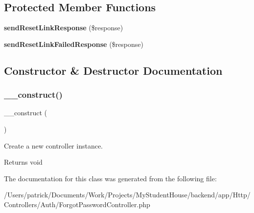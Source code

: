 \subsection*{Protected Member Functions}
\begin{DoxyCompactItemize}
\item 
\mbox{\label{class_app_1_1_http_1_1_controllers_1_1_auth_1_1_forgot_password_controller_a41f2cc3c868b9a160928d2febfa6e597}} 
{\bfseries send\+Reset\+Link\+Response} (\$response)
\item 
\mbox{\label{class_app_1_1_http_1_1_controllers_1_1_auth_1_1_forgot_password_controller_a8c3336a05518b8aca453a4af3836bc47}} 
{\bfseries send\+Reset\+Link\+Failed\+Response} (\$response)
\end{DoxyCompactItemize}


\subsection{Constructor \& Destructor Documentation}
\mbox{\label{class_app_1_1_http_1_1_controllers_1_1_auth_1_1_forgot_password_controller_a095c5d389db211932136b53f25f39685}} 
\subsubsection{\texorpdfstring{\_\_construct()}{\_\_construct()}}
{\footnotesize\ttfamily \+\_\+\+\_\+construct (\begin{DoxyParamCaption}{ }\end{DoxyParamCaption})}

Create a new controller instance.

\begin{DoxyReturn}{Returns}
void 
\end{DoxyReturn}


The documentation for this class was generated from the following file\+:\begin{DoxyCompactItemize}
\item 
/\+Users/patrick/\+Documents/\+Work/\+Projects/\+My\+Student\+House/backend/app/\+Http/\+Controllers/\+Auth/Forgot\+Password\+Controller.\+php\end{DoxyCompactItemize}
